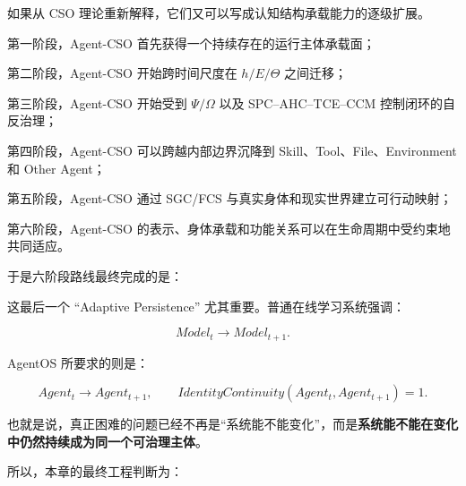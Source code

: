 如果从 CSO 理论重新解释，它们又可以写成认知结构承载能力的逐级扩展。

第一阶段，Agent-CSO 首先获得一个持续存在的运行主体承载面；

第二阶段，Agent-CSO 开始跨时间尺度在 \(h/E/\Theta\) 之间迁移；

第三阶段，Agent-CSO 开始受到 \(\Psi/\Omega\) 以及 SPC--AHC--TCE--CCM 控制闭环的自反治理；

第四阶段，Agent-CSO 可以跨越内部边界沉降到 Skill、Tool、File、Environment 和 Other Agent；

第五阶段，Agent-CSO 通过 SGC/FCS 与真实身体和现实世界建立可行动映射；

第六阶段，Agent-CSO 的表示、身体承载和功能关系可以在生命周期中受约束地共同适应。

于是六阶段路线最终完成的是：

\begin{statementbox}
\centering
{}
\end{statementbox}

这最后一个 ``Adaptive Persistence'' 尤其重要。普通在线学习系统强调：

\[
Model_t\rightarrow Model_{t+1}.
\]

AgentOS 所要求的则是：

\[
\boxed{
Agent_t
\rightarrow
Agent_{t+1},
\qquad
IdentityContinuity(Agent_t,Agent_{t+1})=1.
}
\]

也就是说，真正困难的问题已经不再是“系统能不能变化”，而是\textbf{系统能不能在变化中仍然持续成为同一个可治理主体}。

所以，本章的最终工程判断为：

\begin{statementbox}
\centering
{}
\end{statementbox}
